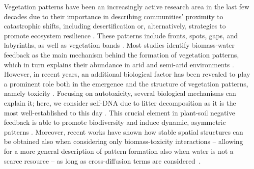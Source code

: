 \documentclass[a4paper,10pt,abstract=true,parskip=true]{scrartcl}
\theoremstyle{remark}
\numberwithin{equation}{section}
\numberwithin{thm}{section}
\begin{document}
Vegetation patterns have been an increasingly active research area in the last few decades due to their importance in describing communities' proximity to catastrophic shifts, including desertification \cite{von_Hardenberg_2001, Kefi_2014} or, alternatively, strategies to promote ecosystem resilience \cite{Banerjee_2026, Bastiaansen_2020_2, Eigentler_2018, Rietkerk_2021}. These patterns include fronts, spots, gaps, and labyrinths, as well as vegetation bands \cite{GIV.2025, Klausmeier_1999, Meron_2012, Meron_2007}. Most studies identify biomass-water feedback as the main mechanism behind the formation of vegetation patterns, which in turn explains their abundance in arid and semi-arid environments \cite{Borgogno_2009, Dijkstra_2011, d2006patterns, Filippini2026, Gandhi_2023, Gilad_2007, Martinez_2023, Meron_2004, Rietkerk_2002}. However, in recent years, an additional biological factor has been revealed to play a prominent role both in the emergence and the structure of vegetation patterns, namely toxicity \cite{Bonanomi_2014, Carteni_2012, Consolo_2023, Ruiz_2023}. Focusing on autotoxicity, several biological mechanisms can explain it; here, we consider self-DNA due to litter decomposition as it is the most well-established to this day \cite{Mazzoleni_2014}. This crucial element in plant-soil negative feedback is able to promote biodiversity \cite{Mazzoleni_2010, Mazzoleni_2007} and induce dynamic, asymmetric patterns \cite{IuorioVeerman.2021, Marasco_2020, Marasco_2014}. Moreover, recent works have shown how stable spatial structures can be obtained also when considering only biomass-toxicity interactions -- allowing for a more general description of pattern formation also when water is not a scarce resource -- as long as cross-diffusion terms are considered~\cite{GIS_2026}.
    
\end{document}
